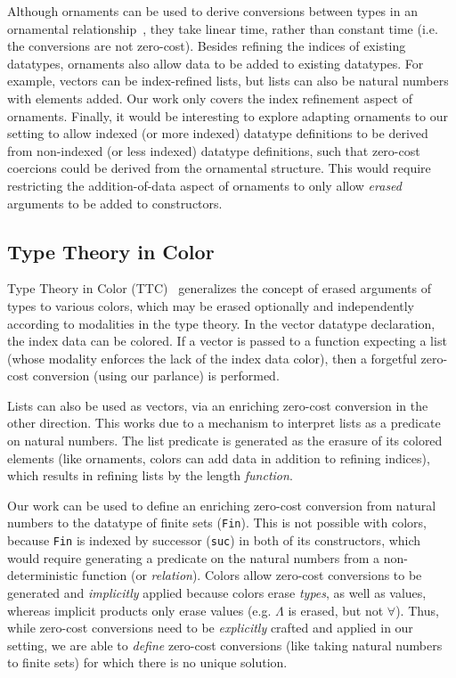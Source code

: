 \documentclass[acmsmall]{acmart}\settopmatter{}
\begin{document}
Although ornaments can be used to derive conversions between
types in an ornamental
relationship~\cite{ornaments:original,ornaments:relational},
they take linear time, rather than constant time (i.e. the conversions
are not zero-cost).
Besides refining the indices of existing datatypes, ornaments
also allow data to be added to existing datatypes. For example, vectors can
be index-refined lists, but lists can also be natural numbers with
elements added. Our work only covers the index refinement aspect of
ornaments. Finally, it would be interesting to explore adapting
ornaments to our setting to allow indexed (or more indexed) datatype
definitions to be derived from non-indexed (or less indexed) datatype
definitions, such that zero-cost coercions could be derived from the
ornamental structure. This would require restricting the
addition-of-data aspect of ornaments to only allow \textit{erased}
arguments to be added to constructors.

\subsection{Type Theory in Color}

Type Theory in Color (TTC)~\cite{bernardy:color}
generalizes the concept of erased arguments
of types to various colors, which may be erased optionally and
independently according to modalities in the type theory. In the vector
datatype declaration, the index data can be colored. If a vector is
passed to a function expecting a list (whose modality enforces the
lack of the index data color), then a forgetful zero-cost conversion
(using our parlance) is performed.

Lists can also be used as vectors, via an enriching zero-cost
conversion in the other direction. This works due to a mechanism to
interpret lists as a predicate on natural numbers. The list predicate is
generated as the erasure of its colored elements (like ornaments,
colors can add data in addition to refining indices), which results in
refining lists by the length \textit{function}.

Our work can be used to define an enriching zero-cost conversion
from natural numbers to the datatype of
finite sets (\texttt{Fin}). This is not possible with colors, because
\texttt{Fin} is indexed by successor (\texttt{suc}) in both of its
constructors, which would require generating a predicate on the
natural numbers from a non-deterministic function (or
\textit{relation}). Colors allow zero-cost conversions to be
generated and \textit{implicitly} applied because colors erase \textit{types}, as
well as values, whereas implicit products only erase values
(e.g. $\Lambda$ is erased, but not $\forall$).
Thus, while zero-cost conversions
need to be \textit{explicitly} crafted and applied in our setting, we
are able to \textit{define} zero-cost conversions (like taking natural numbers to
finite sets) for which there is no unique solution.
\end{document}
